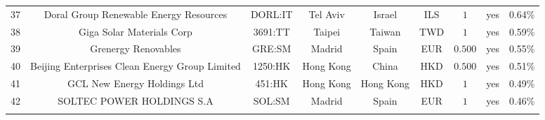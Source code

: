 \begin{table}[!htbp]
\begin{tabular}{@{\extracolsep{5pt}} ccccccccc}
37 & Doral Group Renewable Energy Resources & DORL:IT & Tel Aviv & Israel & ILS & $1$ & yes & 0.64\% \\ 
38 & Giga Solar Materials Corp & 3691:TT & Taipei & Taiwan & TWD & $1$ & yes & 0.59\% \\ 
39 & Grenergy Renovables & GRE:SM & Madrid & Spain & EUR & $0.500$ & yes & 0.55\% \\ 
40 & Beijing Enterprises Clean Energy Group Limited & 1250:HK & Hong Kong & China & HKD & $0.500$ & yes & 0.51\% \\ 
41 & GCL New Energy Holdings Ltd & 451:HK & Hong Kong & Hong Kong & HKD & $1$ & yes & 0.49\% \\ 
42 & SOLTEC POWER HOLDINGS S.A & SOL:SM & Madrid & Spain & EUR & $1$ & yes & 0.46\% \\ 
\hline \\[-1.8ex] 
\end{tabular} 
\end{table} 